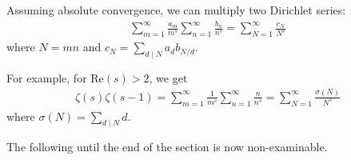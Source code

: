 \documentclass{article}
\theoremstyle{definition}
\begin{document}
Assuming absolute convergence, we can multiply two Dirichlet series:
\begin{align*}
    \sum_{m=1}^{\infty} \frac{a_m}{m^s} \sum_{n=1}^{\infty} \frac{b_n}{n^s} = \sum_{N=1}^{\infty} \frac{c_N}{N^s}
\end{align*}
where $N=mn$ and $c_N = \sum_{d \mid N}^{} a_db_{N/d}$.

For example, for $\text{Re}(s)>2$, we get 
\begin{align*}
    \zeta(s)\zeta(s-1) = \sum_{m=1}^{\infty} \frac{1}{m^s}\sum_{n=1}^{\infty} \frac{n}{n^s} = \sum_{N=1}^{\infty} \frac{\sigma(N)}{N^s}
\end{align*}
where $\sigma(N)=\sum_{d \mid N}^{} d$.
\vspace{1mm}

The following until the end of the section is now non-examinable.
\end{document}
